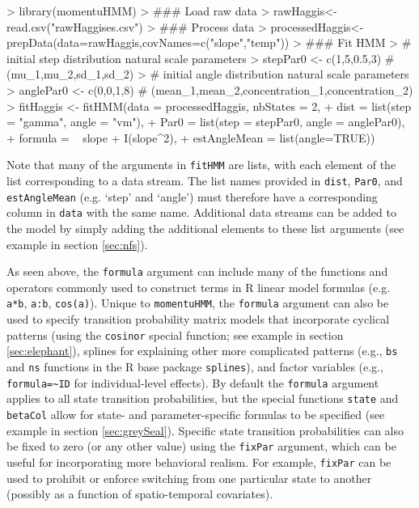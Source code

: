 \documentclass[12pt]{article}
\begin{document}
\begin{Schunk}
\begin{Sinput}
> library(momentuHMM)
> ### Load raw data
> rawHaggis<-read.csv("rawHaggises.csv")
> ### Process data
> processedHaggis<-prepData(data=rawHaggis,covNames=c("slope","temp"))
> ### Fit HMM	
> # initial step distribution natural scale parameters
> stepPar0 <- c(1,5,0.5,3) # (mu_1,mu_2,sd_1,sd_2)
> # initial angle distribution natural scale parameters 
> anglePar0 <- c(0,0,1,8) # (mean_1,mean_2,concentration_1,concentration_2)       	
> fitHaggis <- fitHMM(data = processedHaggis, nbStates = 2,
+                     dist = list(step = "gamma", angle = "vm"),
+                     Par0 = list(step = stepPar0, angle = anglePar0),
+                     formula = ~ slope + I(slope^2),
+                     estAngleMean = list(angle=TRUE))
\end{Sinput}
\end{Schunk}
Note that many of the arguments in \verb|fitHMM| are lists, with each element of the list corresponding to a data stream.  The list names provided in \verb|dist|, \verb|Par0|, and \verb|estAngleMean| (e.g. `step' and `angle') must therefore have a corresponding column in \verb|data| with the same name.  Additional data streams can be added to the model by simply adding the additional elements to these list arguments (see example in section \ref{sec:nfs}).  

As seen above, the \verb|formula| argument can include many of the functions and operators commonly used to construct terms in R linear model formulas (e.g. \verb|a*b|, \verb|a:b|, \verb|cos(a)|). Unique to \verb|momentuHMM|, the \verb|formula| argument can also be used to specify transition probability matrix models that incorporate cyclical patterns (using the \verb|cosinor| special function; see example in section \ref{sec:elephant}), splines for explaining other more complicated patterns (e.g., \verb|bs| and \verb|ns| functions in the R base package \verb|splines|), and factor variables (e.g., \verb|formula=~ID| for individual-level effects).  By default the \verb|formula| argument applies to all state transition probabilities, but the special functions \verb|state| and \verb|betaCol| allow for state- and parameter-specific formulas to be specified (see example in section \ref{sec:greySeal}). Specific state transition probabilities can also be fixed to zero (or any other value) using the \verb|fixPar| argument, which can be useful for incorporating more behavioral realism.  For example, \verb|fixPar| can be used to prohibit or enforce switching from one particular state to another (possibly as a function of spatio-temporal covariates). 
\end{document}
